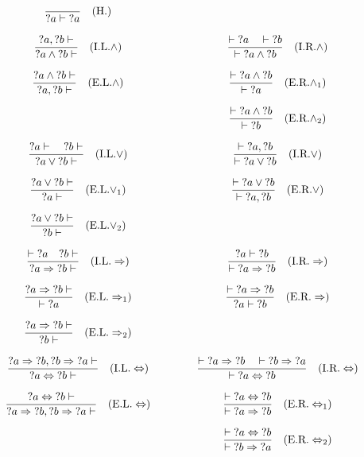 \begin{figure}[hbt!]
  $$\arraycolsep=0.75cm\def\arraystretch{2.75}\begin{array}{c c}
  \dfrac{}{{?a} \vdash {?a}} \quad (\text{H.}) & \\
  \dfrac{{?a}, {?b} \vdash}{{?a} \land {?b} \vdash} \quad (\text{I.L.} \land) & \dfrac{\vdash {?a} \quad \vdash {?b}}{\vdash {?a} \land {?b}} \quad (\text{I.R.} \land) \\
  \dfrac{{?a} \land {?b} \vdash}{{?a}, {?b} \vdash} \quad (\text{E.L.} \land) & \dfrac{\vdash {?a} \land {?b}}{\vdash {?a}} \quad (\text{E.R.} \land_1) \\ %
  & \dfrac{\vdash {?a} \land {?b}}{\vdash {?b}} \quad (\text{E.R.} \land_2) \\
  \dfrac{{?a} \vdash \quad {?b} \vdash}{{?a} \lor {?b} \vdash} \quad (\text{I.L.} \lor) & \dfrac{\vdash {?a}, {?b}}{\vdash {?a} \lor {?b}} \quad (\text{I.R.} \lor) \\
  \dfrac{{?a} \lor {?b} \vdash}{{?a} \vdash} \quad (\text{E.L.} \lor_1) & \dfrac{\vdash {?a} \lor {?b}}{\vdash {?a}, {?b}} \quad (\text{E.R.} \lor) \\ %
  \dfrac{{?a} \lor {?b} \vdash}{{?b} \vdash} \quad (\text{E.L.} \lor_2) & \\
  \dfrac{\vdash {?a} \quad {?b} \vdash}{{?a} \Rightarrow {?b} \vdash} \quad (\text{I.L.} \Rightarrow) & \dfrac{{?a} \vdash {?b}}{\vdash {?a} \Rightarrow {?b}} \quad (\text{I.R.} \Rightarrow) \\
  \dfrac{{?a} \Rightarrow {?b} \vdash}{\vdash {?a}} \quad (\text{E.L.} \Rightarrow_1) & \dfrac{\vdash {?a} \Rightarrow {?b}}{{?a} \vdash {?b}} \quad (\text{E.R.} \Rightarrow) \\ %
  \dfrac{{?a} \Rightarrow {?b} \vdash}{{?b} \vdash} \quad (\text{E.L.} \Rightarrow_2) & \\
  \dfrac{{?a} \Rightarrow {?b}, {?b} \Rightarrow {?a} \vdash}{{?a} \Leftrightarrow {?b} \vdash} \quad (\text{I.L.} \Leftrightarrow) & \dfrac{\vdash {?a} \Rightarrow {?b} \quad \vdash {?b} \Rightarrow {?a}}{\vdash {?a} \Leftrightarrow {?b}} \quad (\text{I.R.} \Leftrightarrow) \\
  \dfrac{{?a} \Leftrightarrow {?b} \vdash}{{?a} \Rightarrow {?b}, {?b} \Rightarrow {?a} \vdash} \quad (\text{E.L.} \Leftrightarrow) & \dfrac{\vdash {?a} \Leftrightarrow {?b}}{\vdash {?a} \Rightarrow {?b}} \quad (\text{E.R.} \Leftrightarrow_1) \\ %
  & \dfrac{\vdash {?a} \Leftrightarrow {?b}}{\vdash {?b} \Rightarrow {?a}} \quad (\text{E.R.} \Leftrightarrow_2) \\

\end{array}$$
\end{figure}
